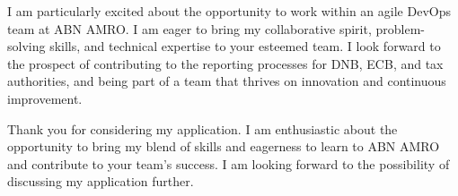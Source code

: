 \documentclass[11pt, a4paper]{awesome-cv}
\begin{document}
\begin{cvletter}
I am particularly excited about the opportunity to work within an agile DevOps team at ABN AMRO. I am eager to bring my collaborative spirit, problem-solving skills, and technical expertise to your esteemed team. I look forward to the prospect of contributing to the reporting processes for DNB, ECB, and tax authorities, and being part of a team that thrives on innovation and continuous improvement.

Thank you for considering my application. I am enthusiastic about the opportunity to bring my blend of skills and eagerness to learn to ABN AMRO and contribute to your team’s success. I am looking forward to the possibility of discussing my application further.
\end{cvletter}

\makeletterclosing
\end{document}
